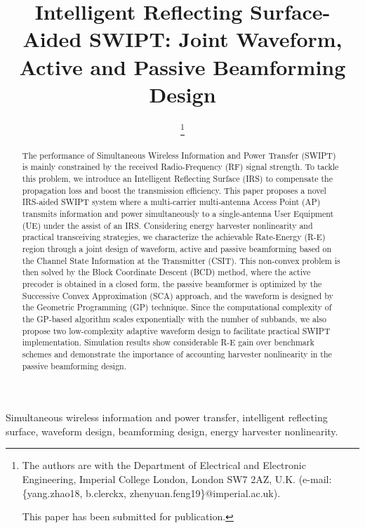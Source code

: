 \documentclass[journal]{IEEEtran}
\begin{document}
	\title{Intelligent Reflecting Surface-Aided SWIPT: Joint Waveform, Active and Passive Beamforming Design}
	\author{
		\thanks{
			The authors are with the Department of Electrical and Electronic Engineering, Imperial College London, London SW7 2AZ, U.K. (e-mail: \{yang.zhao18, b.clerckx, zhenyuan.feng19\}@imperial.ac.uk).

			This paper has been submitted for publication.
		}
	}
	\maketitle


	\begin{abstract}
		The performance of Simultaneous Wireless Information and Power Transfer (SWIPT) is mainly constrained by the received Radio-Frequency (RF) signal strength. To tackle this problem, we introduce an Intelligent Reflecting Surface (IRS) to compensate the propagation loss and boost the transmission efficiency. This paper proposes a novel IRS-aided SWIPT system where a multi-carrier multi-antenna Access Point (AP) transmits information and power simultaneously to a single-antenna User Equipment (UE) under the assist of an IRS. Considering energy harvester nonlinearity and practical transceiving strategies, we characterize the achievable Rate-Energy (R-E) region through a joint design of waveform, active and passive beamforming based on the Channel State Information at the Transmitter (CSIT). This non-convex problem is then solved by the Block Coordinate Descent (BCD) method, where the active precoder is obtained in a closed form, the passive beamformer is optimized by the Successive Convex Approximation (SCA) approach, and the waveform is designed by the Geometric Programming (GP) technique. Since the computational complexity of the GP-based algorithm scales exponentially with the number of subbands, we also propose two low-complexity adaptive waveform design to facilitate practical SWIPT implementation. Simulation results show considerable R-E gain over benchmark schemes and demonstrate the importance of accounting harvester nonlinearity in the passive beamforming design.
	\end{abstract}


	\begin{IEEEkeywords}
		Simultaneous wireless information and power transfer, intelligent reflecting surface, waveform design, beamforming design, energy harvester nonlinearity.
	\end{IEEEkeywords}
\end{document}
